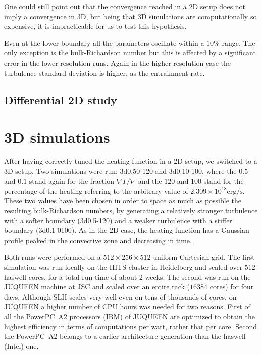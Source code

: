 One could still point out that the convergence reached in a 2D setup does not imply a convergence in 3D, but being that 3D simulations are computationally so expensive, it is impracticable for us to test this hypothesis.

Even at the lower boundary all the parameters oscillate within a $10 \%$ range. The only exception is the bulk-Richardson number but this is affected by a significant error in the lower resolution runs. Again in the higher resolution case the turbulence standard deviation is higher, as the entrainment rate.



\subsection{Differential 2D study}

	


\section{3D simulations}


	After having correctly tuned the heating function in a 2D setup, we switched to a 3D setup. Two simulations were run: 3d0.50-120 and 3d0.10-100, where the $0.5$ and $0.1$ stand again for the fraction $\nabla T / \nabla$ and the $120$ and $100$ stand for the percentage of the heating referring to the arbitrary value of $2.309 \times 10^{18} \mathrm{erg/s}$. These two values have been chosen in order to space as much as possible the resulting bulk-Richardson numbers, by generating a relatively stronger turbulence with a softer boundary (3d0.5-120) and a weaker turbulence with a stiffer boundary (3d0.1-0100). As in the 2D case, the heating function has a Gaussian profile peaked in the convective zone and decreasing in time.

	Both runs were performed on a $512 \times 256 \times 512$ uniform Cartesian grid. The first simulation was run locally on the HITS cluster in Heidelberg and scaled over $512$ haswell cores, for a total run time of about 2 weeks. The second was run on the JUQUEEN machine at JSC and scaled over an entire rack ($16384$ cores) for four days. Although SLH scales very well even on tens of thousands of cores, on JUQUEEN a higher number of CPU hours was needed for two reasons. First of all the PowerPC\textregistered \ A2 processors (IBM) of JUQUEEN are optimized to obtain the highest efficiency in terms of computations per watt, rather that per core. Second the PowerPC\textregistered \ A2 belongs to a earlier architecture generation than the haswell (Intel) one.

